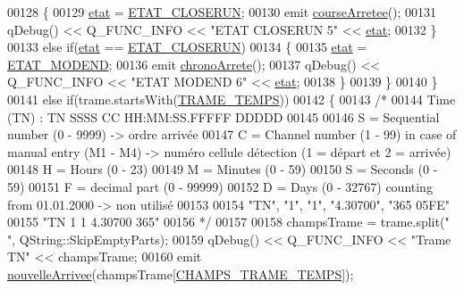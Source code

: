 \begin{DoxyCode}
00128             \{
00129                 \hyperlink{class_chrono_ad82d4f2a230290aa9695f12bf5ac02e8}{etat} = \hyperlink{chrono_8h_aedfd738fe89f9d5e1a9d2c8a08786815}{ETAT\_CLOSERUN};
00130                 emit \hyperlink{class_chrono_a054799dc10e42daff8545689a61aea35}{courseArretee}();
00131                 qDebug() << Q\_FUNC\_INFO << \textcolor{stringliteral}{"ETAT CLOSERUN 5"} << \hyperlink{class_chrono_ad82d4f2a230290aa9695f12bf5ac02e8}{etat};
00132             \}
00133             \textcolor{keywordflow}{else} \textcolor{keywordflow}{if}(\hyperlink{class_chrono_ad82d4f2a230290aa9695f12bf5ac02e8}{etat} == \hyperlink{chrono_8h_aedfd738fe89f9d5e1a9d2c8a08786815}{ETAT\_CLOSERUN})
00134             \{
00135                 \hyperlink{class_chrono_ad82d4f2a230290aa9695f12bf5ac02e8}{etat} = \hyperlink{chrono_8h_a8d3c4247ab94fd8e6757811fb4001f1e}{ETAT\_MODEND};
00136                 emit \hyperlink{class_chrono_a5e28dfd0010e34a19ccb03b9dcbe4dcd}{chronoArrete}();
00137                 qDebug() << Q\_FUNC\_INFO << \textcolor{stringliteral}{"ETAT MODEND 6"} << \hyperlink{class_chrono_ad82d4f2a230290aa9695f12bf5ac02e8}{etat};
00138             \}
00139         \}
00140     \}
00141     \textcolor{keywordflow}{else} \textcolor{keywordflow}{if}(trame.startsWith(\hyperlink{chrono_8h_af6d8d017aa1c07e0c9900e13a60959ba}{TRAME\_TEMPS}))
00142     \{
00143         \textcolor{comment}{/*}
00144 \textcolor{comment}{            Time (TN) : TN SSSS CC HH:MM:SS.FFFFF DDDDD}
00145 \textcolor{comment}{}
00146 \textcolor{comment}{        S = Sequential number (0 - 9999) -> ordre arrivée}
00147 \textcolor{comment}{        C = Channel number (1 - 99) in case of manual entry (M1 - M4) -> numéro cellule détection (1 =
       départ et 2 = arrivée)}
00148 \textcolor{comment}{        H = Hours (0 - 23)}
00149 \textcolor{comment}{        M = Minutes (0 - 59)}
00150 \textcolor{comment}{        S = Seconds (0 - 59)}
00151 \textcolor{comment}{        F = decimal part (0 - 99999)}
00152 \textcolor{comment}{        D = Days (0 - 32767) counting from 01.01.2000 -> non utilisé}
00153 \textcolor{comment}{}
00154 \textcolor{comment}{        "TN", "1", "1", "4.30700", "365 05FE"}
00155 \textcolor{comment}{        "TN         1  1        4.30700   365"}
00156 \textcolor{comment}{        */}
00157 
00158         champsTrame = trame.split(\textcolor{stringliteral}{" "}, QString::SkipEmptyParts);
00159         qDebug() << Q\_FUNC\_INFO << \textcolor{stringliteral}{"Trame TN"} << champsTrame;
00160         emit \hyperlink{class_chrono_a38cf60f7ab1969d7fd1e672868156135}{nouvelleArrivee}(champsTrame[\hyperlink{chrono_8h_ad727a8a4b248052dfc12e6b4320d5f29}{CHAMPS\_TRAME\_TEMPS}]);

\end{DoxyCode}
